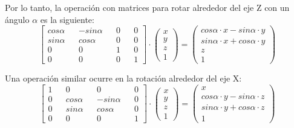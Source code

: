 Por lo tanto, la operación con matrices para rotar alrededor del eje Z con un ángulo $\alpha$ es la siguiente:
\begin{equation*}
  \begin{bmatrix}
    cos \alpha && -sin\alpha && 0 && 0 \\
    sin \alpha && cos\alpha && 0 && 0 \\
    0 && 0 && 1 && 0 \\
    0 && 0 && 0 && 1
  \end{bmatrix}
  \cdot
  \begin{pmatrix}
    x \\ y \\ z \\ 1
  \end{pmatrix}
  =
  \begin{pmatrix}
    cos \alpha \cdot x - sin \alpha \cdot y \\
    sin \alpha \cdot x + cos \alpha \cdot y \\
    z \\
    1
  \end{pmatrix}
\end{equation*}

Una operación similar ocurre en la rotación alrededor del eje X:
\begin{equation*}
  \begin{bmatrix}
    1 && 0 && 0 && 0 \\
    0 && cos \alpha && -sin \alpha && 0 \\
    0 && sin \alpha && cos \alpha && 0 \\
    0 && 0 && 0 && 1
  \end{bmatrix}
  \cdot
  \begin{pmatrix}
    x \\ y \\ z \\ 1
  \end{pmatrix}
  =
  \begin{pmatrix}
    x \\
    cos \alpha \cdot y - sin \alpha \cdot z \\
    sin \alpha \cdot y + cos \alpha \cdot z \\
    1
  \end{pmatrix}
\end{equation*}

